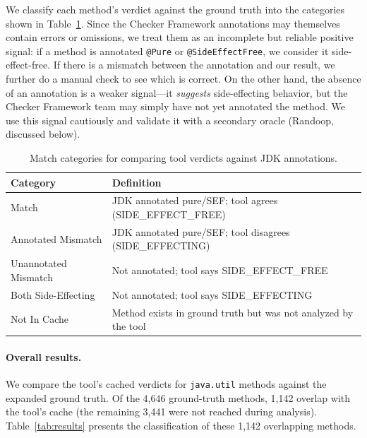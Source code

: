 We classify each method's verdict against the ground truth into the categories shown in Table~\ref{tab:categories}.
Since the Checker Framework annotations may themselves contain errors or omissions,
we treat them as an incomplete but reliable positive signal: if a method is annotated \texttt{@Pure} or \texttt{@SideEffectFree}, we consider it side-effect-free.
If there is a mismatch between the annotation and our result, we further do a manual check to see which is correct.
On the other hand, the absence of an annotation is a weaker signal---it \emph{suggests} side-effecting behavior, but the Checker Framework team may simply have not yet annotated the method.
We use this signal cautiously and validate it with a secondary oracle (Randoop, discussed below).

\begin{table}[H]
\centering
\caption{Match categories for comparing tool verdicts against JDK annotations.}
\label{tab:categories}
\begin{tabular}{lp{8cm}}
\toprule
\textbf{Category} & \textbf{Definition} \\
\midrule
Match & JDK annotated pure/SEF; tool agrees (SIDE\_EFFECT\_FREE) \\
Annotated Mismatch & JDK annotated pure/SEF; tool disagrees (SIDE\_EFFECTING) \\
Unannotated Mismatch & Not annotated; tool says SIDE\_EFFECT\_FREE \\
Both Side-Effecting & Not annotated; tool says SIDE\_EFFECTING \\
Not In Cache & Method exists in ground truth but was not analyzed by the tool \\
\bottomrule
\end{tabular}
\end{table}




\paragraph{Overall results.}
We compare the tool's cached verdicts for \texttt{java.util} methods against the expanded ground truth.
Of the 4,646 ground-truth methods, 1,142 overlap with the tool's cache (the remaining 3,441 were not reached during analysis).
Table~\ref{tab:results} presents the classification of these 1,142 overlapping methods.

